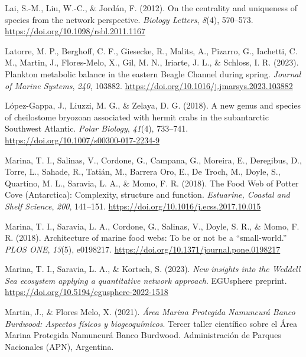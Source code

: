 \documentclass[preprint, 3p,
authoryear]{elsarticle} %
\newlength{\cslhangindent}
\newlength{\cslentryspacingunit} %
\newenvironment{CSLReferences}[2] %
 {%
  \setlength{\parindent}{0pt}
  \ifodd #1
  \let\oldpar\par
  \def\par{\hangindent=\cslhangindent\oldpar}
  \fi
  \setlength{\parskip}{#2\cslentryspacingunit}
 }%
 {}
\begin{document}
\begin{CSLReferences}{1}{0}
\leavevmode{}%
Lai, S.-M., Liu, W.-C., \& Jordán, F. (2012). On the centrality and
uniqueness of species from the network perspective. \emph{Biology
Letters}, \emph{8}(4), 570--573.
\url{https://doi.org/10.1098/rsbl.2011.1167}

\leavevmode{}%
Latorre, M. P., Berghoff, C. F., Giesecke, R., Malits, A., Pizarro, G.,
Iachetti, C. M., Martin, J., Flores-Melo, X., Gil, M. N., Iriarte, J.
L., \& Schloss, I. R. (2023). Plankton metabolic balance in the eastern
{Beagle Channel} during spring. \emph{Journal of Marine Systems},
\emph{240}, 103882. \url{https://doi.org/10.1016/j.jmarsys.2023.103882}

\leavevmode{}%
López-Gappa, J., Liuzzi, M. G., \& Zelaya, D. G. (2018). A new genus and
species of cheilostome bryozoan associated with hermit crabs in the
subantarctic {Southwest Atlantic}. \emph{Polar Biology}, \emph{41}(4),
733--741. \url{https://doi.org/10.1007/s00300-017-2234-9}

\leavevmode{}%
Marina, T. I., Salinas, V., Cordone, G., Campana, G., Moreira, E.,
Deregibus, D., Torre, L., Sahade, R., Tatián, M., Barrera Oro, E., De
Troch, M., Doyle, S., Quartino, M. L., Saravia, L. A., \& Momo, F. R.
(2018). The {Food Web} of {Potter Cove} ({Antarctica}): Complexity,
structure and function. \emph{Estuarine, Coastal and Shelf Science},
\emph{200}, 141--151. \url{https://doi.org/10.1016/j.ecss.2017.10.015}

\leavevmode{}%
Marina, T. I., Saravia, L. A., Cordone, G., Salinas, V., Doyle, S. R.,
\& Momo, F. R. (2018). Architecture of marine food webs: {To} be or not
be a {``small-world.''} \emph{PLOS ONE}, \emph{13}(5), e0198217.
\url{https://doi.org/10.1371/journal.pone.0198217}

\leavevmode{}%
Marina, T. I., Saravia, L. A., \& Kortsch, S. (2023). \emph{New insights
into the {Weddell Sea} ecosystem applying a quantitative network
approach}. {EGUsphere preprint}.
\url{https://doi.org/10.5194/egusphere-2022-1518}

\leavevmode{}%
Martin, J., \& Flores Melo, X. (2021). \emph{{Área Marina Protegida
Namuncurá Banco Burdwood: Aspectos físicos y biogeoquímicos}}. {Tercer
taller científico sobre el Área Marina Protegida Namuncurá Banco
Burdwood. Administración de Parques Nacionales (APN), Argentina}.


\end{CSLReferences}
\end{document}

